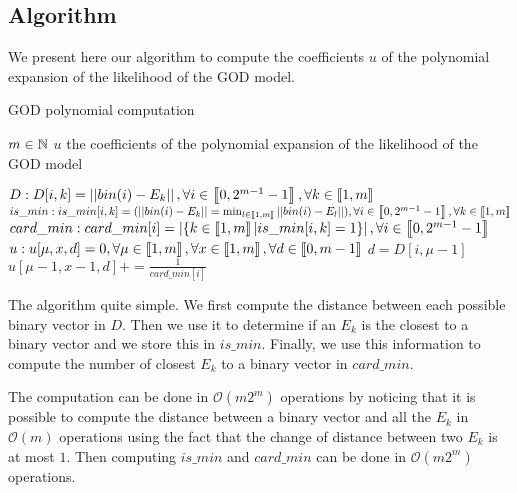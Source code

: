 \subsection{Algorithm}

\label{sec:god_polynomial_computation}

We present here our algorithm to compute the coefficients $u$ of the polynomial expansion of the likelihood of the GOD model. 


\begin{algorithm}[H]
    \caption{GOD polynomial computation}
    \begin{algorithmic}[1]
    \Require $m \in \mathbb{N}$
    \Ensure $u$ the coefficients of the polynomial expansion of the likelihood of the GOD model  
        
    \State $D : D[i, k] = \left|\left|bin(i) - E_k\right|\right|, \forall i \in \left\llbracket0, 2^{m - 1} - 1\right\rrbracket, \forall k \in \left\llbracket1, m\right\rrbracket$
    \State $is\_min : is\_min[i, k] = (\left|\left|bin(i) - E_k\right|\right| = \min_{l \in \left\llbracket1, m\right\rrbracket} \left|\left|bin(i) - E_l\right|\right|), \forall i \in \left\llbracket0, 2^{m - 1} - 1\right\rrbracket, \forall k \in \left\llbracket1, m\right\rrbracket$
    \State $card\_min : card\_min[i] = \left|\left\{ k \in \left\llbracket1, m\right\rrbracket | is\_min[i, k] = 1 \right\}\right|, \forall i \in \left\llbracket0, 2^{m - 1} - 1\right\rrbracket$
    \State $u : u[\mu, x, d] = 0, \forall \mu \in \left\llbracket1, m\right\rrbracket, \forall x \in \left\llbracket1, m\right\rrbracket, \forall d \in \left\llbracket0, m - 1\right\rrbracket$
                    \State $d = D[i, \mu - 1]$
                    \State $u[\mu - 1, x - 1, d] += \frac{1}{card\_min[i]}$  
                \EndFor
            \EndIf    
        \EndFor
    \EndFor    
\end{algorithmic}
\end{algorithm}

The algorithm quite simple. We first compute the distance between each possible binary vector in $D$. Then we use it to determine if an $E_k$ is the closest to a binary vector and we store this in $is\_min$. Finally, we use this information to compute the number of closest $E_k$ to a binary vector in $card\_min$. 

The computation can be done in $\mathcal O(m 2^m)$ operations by noticing that it is possible to compute the distance between a binary vector and all the $E_k$ in $\mathcal O(m)$ operations using the fact that the change of distance between two $E_k$ is at most $1$. Then computing $is\_min$ and $card\_min$ can be done in $\mathcal O(m 2^m)$ operations.

